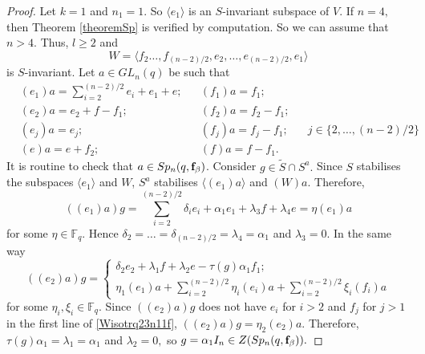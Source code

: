 \begin{proof}
Let $k=1$ and $n_1 = 1.$ So $\langle e_1\rangle$ is an $S$-invariant subspace of $V$. If $n=4,$ then  Theorem \ref{theoremSp} is verified by computation. So we can assume that $n>4.$ 
Thus, $l \ge 2$ and 
$$W= \langle f_2 \ldots, f_{(n-2)/2}, e_2, \ldots, e_{(n-2)/2}, e_1 \rangle $$
is $S$-invariant.
Let $a \in GL_n(q)$ be such that
\begin{equation}\label{aSp2n11}
\begin{aligned}
&(e_1)a =\sum_{i=2}^{(n-2)/2} e_i +e_1 + e; & & (f_1)a=f_1; \\
&(e_2)a = e_2 + f -f_1; & & (f_2)a=f_2 -f_1; \\
&(e_{j})a =e_{j};  & &(f_{j})a=f_{j} - f_1; && j\in \{2, \ldots, (n-2)/2 \}   \\
& (e)a=e+f_2; & & (f)a=f-f_1.
\end{aligned}
\end{equation}
It is routine to check that $a \in Sp_n(q, {\bf f}_{\beta})$. Consider $g \in \tilde{S} \cap S^a.$  Since $S$ stabilises the  subspaces $\langle e_1 \rangle$ and $W$,  $S^a$ stabilises $\langle (e_1)a \rangle$ and $(W)a.$ Therefore, 
\begin{equation}\label{Wisotrq23n11}
((e_1)a)g=
\sum_{i=2}^{(n-2)/2}\delta_i e_i +\alpha_1e_1 + \lambda_3 f +\lambda_4 e= \eta (e_1)a
\end{equation}
for some $\eta \in \mathbb{F}_q.$ Hence $\delta_2= \ldots = \delta_{(n-2)/2}=\lambda_4=\alpha_1$ and $\lambda_3=0.$
In the same way 
\begin{equation}\label{Wisotrq23n11f}
((e_2)a)g=
\begin{cases}
\delta_2 e_2 + \lambda_1 f +\lambda_2 e - \tau(g)\alpha_1 f_1;\\
\eta_1 (e_1)a+ \sum_{i=2}^{(n-2)/2} \eta_i (e_i)a+ \sum_{i=2}^{(n-2)/2} \xi_i (f_i)a
\end{cases}
\end{equation}
for some $\eta_i, \xi_i \in \mathbb{F}_q.$ Since $((e_2)a)g$ does not have $e_i$ for $i>2$ and $f_j$ for $j>1$ in the first line of \eqref{Wisotrq23n11f}, $((e_2)a)g= \eta_2 (e_2)a$. Therefore, 
$\tau(g)\alpha_1=\lambda_1=\alpha_1$ and $\lambda_2=0,$ so $g= \alpha_1 I_n \in Z(Sp_n(q, {\bf f}_{\beta})).$


\end{proof}
